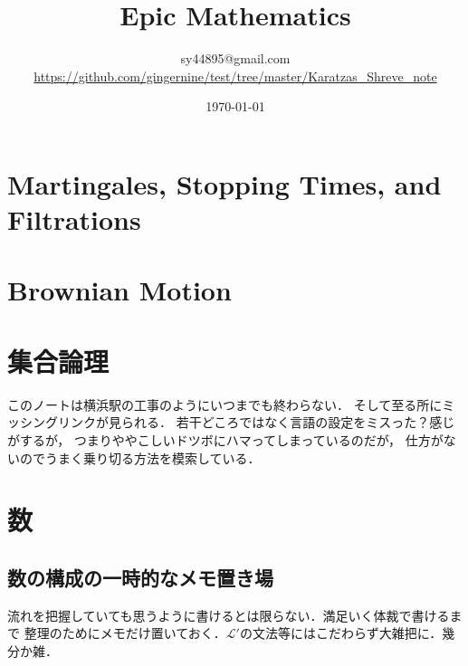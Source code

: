 \documentclass[a4j,10.5pt,oneside,openany]{jsbook}
\title{Epic Mathematics}
\author{sy44895@gmail.com \\ \url{https://github.com/gingernine/test/tree/master/Karatzas_Shreve_note}}
\date{\today}
\theoremstyle{mystyle}
\begin{document}
%
%
\maketitle


%
%
\tableofcontents
\frontmatter
%
\mainmatter
%
\chapter{Martingales, Stopping Times, and Filtrations}








\chapter{Brownian Motion}









\appendix
\chapter{集合論理}
	このノートは横浜駅の工事のようにいつまでも終わらない．
	そして至る所にミッシングリンクが見られる．
	若干どころではなく言語の設定をミスった？感じがするが，
	つまりややこしいドツボにハマってしまっているのだが，
	仕方がないのでうまく乗り切る方法を模索している．
	\label{sec:logic_and_set_theory}
	
	
	
	
	
	
	
	
	
	
	
	
	

\chapter{数}
	
	
	\section{数の構成の一時的なメモ置き場}
		流れを把握していても思うように書けるとは限らない．満足いく体裁で書けるまで
		整理のためにメモだけ置いておく．$\mathcal{L}'$の文法等にはこだわらず大雑把に．幾分か雑．
		
		
		
	
	
	
	
	
	
	
	
	
\end{document}
